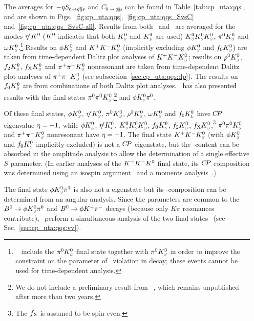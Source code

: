 The averages for $-\etacp S_{b \to q\bar q s}$ and $C_{b \to q\bar q s}$
can be found in Table~\ref{tab:cp_uta:qqs},
and are shown in Figs.~\ref{fig:cp_uta:qqs},~\ref{fig:cp_uta:qqs_SvsC} 
and~\ref{fig:cp_uta:qqs_SvsC-all}.
Results from both \babar\  and \belle\ are averaged for the modes
${\eta^{\prime}}K^0$ ($K^0$ indicates that both $K^0_{\scriptscriptstyle S}$ and $K^0_{\scriptscriptstyle L}$ are used)
$K^0_{\scriptscriptstyle S}K^0_{\scriptscriptstyle S}K^0_{\scriptscriptstyle S}$, $\pi^0 K^0_{\scriptscriptstyle S}$ and $\omega K^0_{\scriptscriptstyle S}$.\footnote{
  \belle~\cite{Fujikawa:2008pk} include the $\pi^0K^0_{\scriptscriptstyle L}$ final state together with $\pi^0 K^0_{\scriptscriptstyle S}$ in order to improve the constraint on the parameter of \CP\ violation in decay; these events cannot be used for time-dependent analysis.
}
Results on $\phi K^0_{\scriptscriptstyle S}$ and $K^+K^-K^0_{\scriptscriptstyle S}$ (implicitly excluding $\phi K^0_{\scriptscriptstyle S}$ and $f_0K^0_{\scriptscriptstyle S}$) are taken from time-dependent Dalitz plot analyses of $K^+K^-K^0_{\scriptscriptstyle S}$;
results on $\rho^0K^0_{\scriptscriptstyle S}$, $f_2K^0_{\scriptscriptstyle S}$, $f_{\rm X}K^0_{\scriptscriptstyle S}$ and $\pi^+\pi^-K^0_{\scriptscriptstyle S}$ nonresonant are taken from time-dependent Dalitz plot analyses of $\pi^+\pi^-K^0_{\scriptscriptstyle S}$ (see
subsection~\ref{sec:cp_uta:qqs:dp}).
The results on $f_0K^0_{\scriptscriptstyle S}$ are from combinations of both Dalitz plot analyses.
\babar\ has also presented results with the final states
$\pi^0\pi^0K^0_{\scriptscriptstyle S}$,\footnote{
  We do not include a preliminary result from \belle~\cite{:2007xd}, which
  remains unpublished after more than two years.
}
and $\phi K^0_{\scriptscriptstyle S} \pi^0$. 

Of these final states,
$\phi K^0_{\scriptscriptstyle S}$, ${\eta^{\prime}}K^0_{\scriptscriptstyle S}$, $\pi^0 K^0_{\scriptscriptstyle S}$, $\rho^0K^0_{\scriptscriptstyle S}$, $\omega K^0_{\scriptscriptstyle S}$ and $f_0K^0_{\scriptscriptstyle L}$
have $C\!P$ eigenvalue ${\eta} = -1$, 
while $\phi K^0_{\scriptscriptstyle L}$, ${\eta^{\prime}}K^0_{\scriptscriptstyle L}$, $K^0_{\scriptscriptstyle S}K^0_{\scriptscriptstyle S}K^0_{\scriptscriptstyle S}$, $f_0 K^0_{\scriptscriptstyle S}$, $f_2 K^0_{\scriptscriptstyle S}$, 
$f_{\rm X} K^0_{\scriptscriptstyle S}$,\footnote{ 
  The $f_{\rm X}$ is assumed to be spin even.
} $\pi^0\pi^0K^0_{\scriptscriptstyle S}$ and $\pi^+ \pi^- K^0_{\scriptscriptstyle S}$ nonresonant have ${\eta} = +1$.
The final state $K^+K^-K^0_{\scriptscriptstyle S}$ (with $\phi K^0_{\scriptscriptstyle S}$ and $f_0K^0_{\scriptscriptstyle S}$ implicitly excluded)
is not a $C\!P$ eigenstate, but the \CP-content can be absorbed in the amplitude analysis to allow the determination of a single effective $S$ parameter.
(In earlier analyses of the $K^+K^-K^0$ final state,
its $C\!P$ composition was determined using an isospin argument~\cite{Abe:2006gy}
and a moments analysis~\cite{Aubert:2005ja}.)



The final state $\phi K^0_{\scriptscriptstyle S} \pi^0$ is also not a \CP eigenstate but its
\CP-composition can be determined from an angular analysis.
Since the parameters are common to the $B^0\to\phi K^0_{\scriptscriptstyle S} \pi^0$ and
$B^0\to \phi K^+\pi^-$ decays (because only $K\pi$ resonances contribute),
\babar\ perform a simultaneous analysis of the two final
states~\cite{Aubert:2008zza} (see Sec.~\ref{sec:cp_uta:qqs:vv}).

